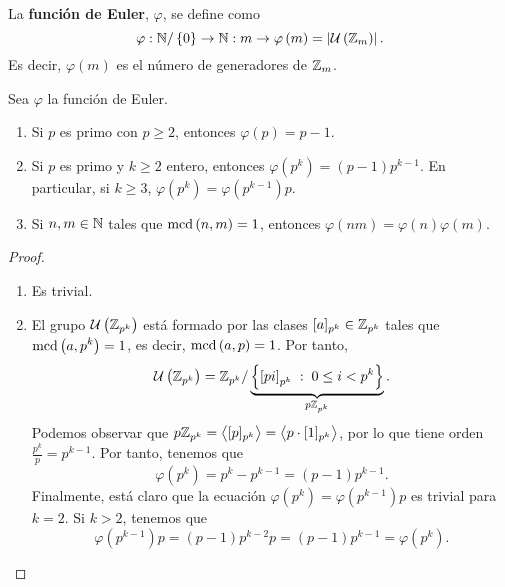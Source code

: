 \begin{definition}
	La \textbf{función de Euler}, $\displaystyle \varphi $, se define como 
	\[ \varphi: \mathbb{N} / \left\{ 0\right\} \to \mathbb{N} : m \to \varphi\left(m\right) = \left|\mathcal{U}\left(\mathbb{Z}_{m}\right)\right|.\]
	Es decir, $\displaystyle \varphi\left(m\right) $ es el número de generadores de $\displaystyle \mathbb{Z}_{m} $.
\end{definition}
\begin{prop}
Sea $\displaystyle \varphi $ la función de Euler. 
\begin{enumerate}
\item Si $\displaystyle p $ es primo con $\displaystyle p \geq 2 $, entonces $\displaystyle \varphi\left(p\right) = p - 1 $.
\item Si $\displaystyle p $ es primo y $\displaystyle k \geq 2 $ entero, entonces $\displaystyle \varphi\left(p^{k}\right) = \left(p-1\right)p^{k -1} $. En particular, si $\displaystyle k \geq 3 $, $\displaystyle \varphi\left(p^{k}\right) = \varphi\left(p^{k-1}\right)p $.
\item Si $\displaystyle n,m \in \mathbb{N} $ tales que $\displaystyle \text{mcd}\left(n,m\right) = 1 $, entonces $\displaystyle \varphi\left(nm\right) = \varphi\left(n\right)\varphi\left(m\right) $.
\end{enumerate}
\end{prop}
\begin{proof}
\begin{enumerate}
\item Es trivial.
\item El grupo $\displaystyle \mathcal{U}\left(\mathbb{Z}_{p^{k}}\right) $ está formado por las clases $\displaystyle [a]_{p^{k}} \in \mathbb{Z}_{p^{k}} $ tales que $\displaystyle \text{mcd}\left(a,p^{k}\right) = 1 $, es decir, $\displaystyle \text{mcd}\left(a,p\right) = 1 $. Por tanto, 
	\[\mathcal{U}\left(\mathbb{Z}_{p^{k}}\right) = \mathbb{Z}_{p^{k}} / \underbrace{\left\{ \left[p i \right] _{p^{k}} \; : \; 0 \leq i < p^{k}\right\}}_{p\mathbb{Z}_{p^{k}}} .\]
	Podemos observar que $\displaystyle p\mathbb{Z}_{p^{k}} = \left\langle [p]_{p^{k}} \right\rangle = \left\langle p \cdot [1]_{p^{k}} \right\rangle  $, por lo que tiene orden $\displaystyle \frac{p^{k}}{p} = p^{k-1} $. Por tanto, tenemos que
	\[\varphi\left(p^{k}\right) = p^{k}-p^{k-1} = \left(p - 1\right)p^{k-1} .\]
Finalmente, está claro que la ecuación $\displaystyle \varphi\left(p^{k}\right) = \varphi\left(p^{k-1}\right)p $ es trivial para $\displaystyle k = 2 $. Si $\displaystyle k > 2 $, tenemos que
\[\varphi\left(p^{k-1}\right)p = \left(p-1\right)p^{k-2}p = \left(p-1\right)p^{k-1} = \varphi\left(p^{k}\right) .\]
\end{enumerate}
\end{proof}

